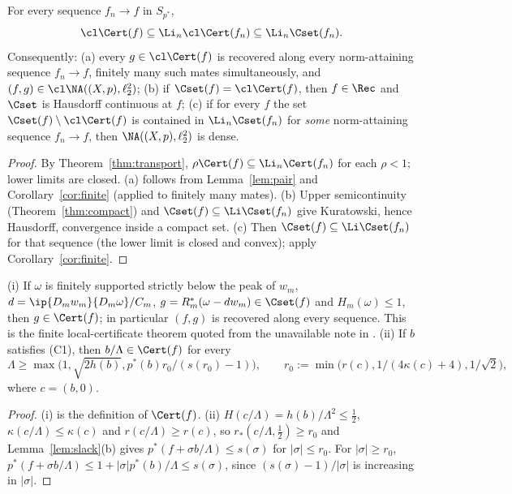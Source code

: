 \begin{corollary}\label{cor:lsc}
For every sequence $f_n\to f$ in $S_{p^*}$,
\[
 \cl\Cert(f)\subseteq\Li_n\cl\Cert(f_n)\subseteq\Li_n\Cset(f_n).
\]
Consequently: \textup{(a)} every $g\in\cl\Cert(f)$ is recovered along every
norm-attaining sequence $f_n\to f$, finitely many such mates simultaneously,
and $(f,g)\in\cl\NA((X,p),\ell_2^2)$; \textup{(b)} if
$\Cset(f)=\cl\Cert(f)$, then $f\in\Rec$ and $\Cset$ is Hausdorff continuous
at $f$; \textup{(c)} if for every $f$ the set $\Cset(f)\setminus\cl\Cert(f)$
is contained in $\Li_n\Cset(f_n)$ for \emph{some} norm-attaining sequence
$f_n\to f$, then $\NA((X,p),\ell_2^2)$ is dense.
\end{corollary}

\begin{proof}
By Theorem~\ref{thm:transport}, $\rho\Cert(f)\subseteq\Li_n\Cert(f_n)$ for
each $\rho<1$; lower limits are closed.  (a) follows from
Lemma~\ref{lem:pair} and Corollary~\ref{cor:finite} (applied to finitely
many mates).  (b) Upper semicontinuity (Theorem~\ref{thm:compact}) and
$\Cset(f)\subseteq\Li\Cset(f_n)$ give Kuratowski, hence Hausdorff,
convergence inside a compact set.  (c) Then $\Cset(f)\subseteq
\Li\Cset(f_n)$ for that sequence (the lower limit is closed and convex);
apply Corollary~\ref{cor:finite}.
\end{proof}

\begin{corollary}\label{cor:check}
\textup{(i)} If $\omega$ is finitely supported strictly below the peak of
$w_m$, $d=\ip{D_mw_m}{D_m\omega}/C_m$, $g=R_m^*(\omega-dw_m)\in\Cset(f)$
and $H_m(\omega)\le1$, then $g\in\Cert(f)$; in particular $(f,g)$ is
recovered along every sequence.  This is the finite local-certificate
theorem quoted from the unavailable note \cite{Check} in \cite{PrA}.
\textup{(ii)} If $b$ satisfies \textup{(C1)}, then $b/\Lambda\in\Cert(f)$
for every
\[
 \Lambda\ge\max\big(1,\sqrt{2h(b)},p^*(b)r_0/(s(r_0)-1)\big),
 \qquad r_0:=\min\big(r(c),1/(4\kappa(c)+4),1/\sqrt2\big),
\]
where $c=(b,0)$.
\end{corollary}

\begin{proof}
(i) is the definition of $\Cert(f)$.  (ii) $H(c/\Lambda)=h(b)/\Lambda^2\le
\frac12$, $\kappa(c/\Lambda)\le\kappa(c)$ and $r(c/\Lambda)\ge r(c)$, so
$r_*(c/\Lambda,\frac12)\ge r_0$ and Lemma~\ref{lem:slack}(b) gives
$p^*(f+\sigma b/\Lambda)\le s(\sigma)$ for $|\sigma|\le r_0$.  For
$|\sigma|\ge r_0$, $p^*(f+\sigma b/\Lambda)\le1+|\sigma|p^*(b)/\Lambda\le
s(\sigma)$, since $(s(\sigma)-1)/|\sigma|$ is increasing in $|\sigma|$.
\end{proof}

